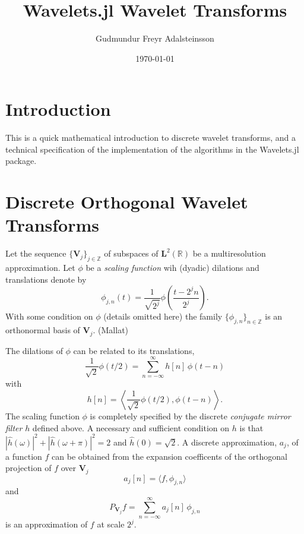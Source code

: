 \documentclass[a4paper,11pt]{article}
\title{Wavelets.jl Wavelet Transforms}
\author{Gudmundur Freyr Adalsteinsson} \date{\today}
\begin{document}
\maketitle

\section{Introduction} \label{sec:int}

This is a quick mathematical introduction to discrete wavelet transforms, and a technical specification of the implementation of the algorithms in the Wavelets.jl package.

\section{Discrete Orthogonal Wavelet Transforms}

Let the sequence $\{ \mathbf V_j \}_{j\in \mathbb Z}$ of subspaces of $\mathbf L^2(\mathbb R)$ be a multiresolution approximation. Let $\phi$ be a \emph{scaling function} wih (dyadic) dilations and translations denote by
\begin{equation} \label{eq:psi}
    \phi_{j,n}(t) = \frac{1}{\sqrt{2^j}} \phi\left(\frac{t-2^jn}{2^j}\right).
\end{equation}
With some condition on $\phi$ (details omitted here) the family $\{ \phi_{j,n} \}_{n\in \mathbb Z}$ is an orthonormal basis of $\mathbf V_j$. (Mallat)

The dilations of $\phi$ can be related to its translations,
\begin{equation}
    \frac{1}{\sqrt{2}} \phi(t/2) = \sum_{n = -\infty}^{\infty} h[n]\,\phi(t - n)
\end{equation}
with
\begin{equation}
    h[n] = \left\langle \frac{1}{\sqrt{2}} \phi(t/2), \phi(t - n) \right\rangle.
\end{equation}
The scaling function $\phi$ is completely specified by the discrete \emph{conjugate mirror filter} $h$ defined above. A necessary and sufficient condition on $h$ is that $|\hat h(\omega)|^2 + |\hat h(\omega + \pi)|^2 = 2$ and $\hat h(0) = \sqrt{2}$. A discrete approximation, $a_j$, of a function $f$ can be obtained from the expansion coefficents of the orthogonal projection of $f$ over $\mathbf V_j$
\begin{equation}
    a_j[n] =  \langle f, \phi_{j,n} \rangle
\end{equation}
and
\begin{equation}
    P_{\mathbf V_j}f = \sum_{n = -\infty}^{\infty} a_j[n]\,\phi_{j,n}
\end{equation}
is an approximation of $f$ at scale $2^j$.
\end{document}
